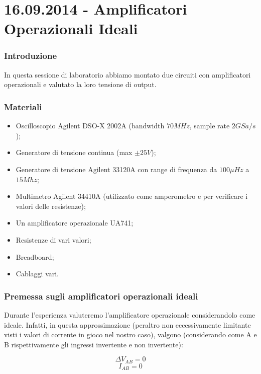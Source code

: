 \documentclass {article}
\begin{document}
\part*{16.09.2014 - Amplificatori Operazionali Ideali}

\section{Introduzione}

In questa sessione di laboratorio abbiamo montato due circuiti con amplificatori operazionali e valutato la loro tensione di output.

\section{Materiali}

\begin{itemize} [noitemsep]
\item Oscilloscopio Agilent DSO-X 2002A (bandwidth $70 MHz$, sample rate $2 GSa/s$);
\item Generatore di tensione continua (max $\pm 25 V$);
\item Generatore di tensione Agilent 33120A con range di frequenza da $100 \mu Hz$ a $15 Mhz$;
\item Multimetro Agilent 34410A (utilizzato come amperometro e per verificare i valori delle resistenze);
\item Un amplificatore operazionale UA741;
\item Resistenze di vari valori;
\item Breadboard;
\item Cablaggi vari.
\end{itemize}

\section{Premessa sugli amplificatori operazionali ideali}

Durante l'esperienza valuteremo l'amplificatore operazionale considerandolo come ideale. Infatti, in questa approssimazione (peraltro non eccessivamente limitante visti i valori di corrente in gioco nel nostro caso), valgono (considerando come A e B rispettivamente gli ingressi invertente e non invertente):

\begin{equation}
\Delta V_{AB}=0
\label{eq:regola_V}
\end{equation}
\begin{equation}
I_{AB}=0
\label{eq:regola_I}
\end{equation}
\end{document}
